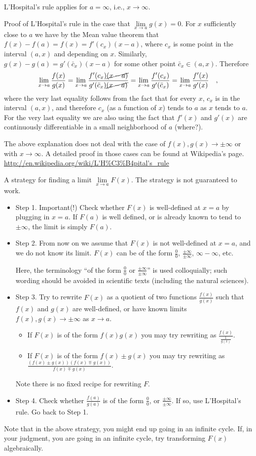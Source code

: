 \documentclass[12pt]{book}
\begin{document}
L'Hospital's rule applies for $a=\infty$, i.e., $x\to \infty$. 

Proof of L'Hospital's rule in the case that $\lim\limits_{x\to a}g(x)=0 $. For $x$ sufficiently close to $a$ we have by the Mean value theorem that $f(x)-f(a)=f(x)=  f'(c_x) (x-a) $, where $c_x$ is some point in the interval $(a,x)$ and depending on $x$. Similarly, $g(x)- g(a)= g'(\bar c_x)(x-a)$ for some other point $\bar c_x\in (a,x)$. Therefore 
\[
\lim\limits_{x\to a}\frac{f(x)}{g(x)}=\lim\limits_{x\to a}\frac{f'(c_x) \cancel{(x-a)}}{ g'(\bar c_x)\cancel{(x-a)}} = \lim\limits_{x\to a}\frac{f'(c_x) }{ g'(\bar c_x)}=\lim\limits_{x\to a}\frac{f'(x) }{ g'(x)}\quad , 
\] 
where the very last equality follows from the fact that for every $x$, $c_x$ is in the interval $(a,x)$, and therefore $c_x$ (as a function of $x$) tends to $a$ as $x$ tends to $a$. For the very last equality we are also using the fact that $f'(x)$ and $g'(x)$ are continuously differentiable in a small neighborhood of $a$ (where?).

The above explanation does not deal with the case of $f(x), g(x)\to\pm \infty $ or with $x\to \infty$. A detailed proof in those cases can be found at Wikipedia's page.
\url{http://en.wikipedia.org/wiki/L'H%C3%B4pital's_rule}

A strategy for finding a limit $\lim\limits_{x\to a}F(x)$. The strategy is not guaranteed to work.
\begin{itemize}
\item Step 1. Important(!) Check whether $F(x)$ is well-defined at $x=a$ by plugging in $x=a$. If $F(a)$ is well defined, or is already known to tend to $\pm \infty$, the limit is simply $F(a)$.
\item Step 2. From now on we assume that $F(x)$ is not well-defined at $x=a$, and we do not know its limit. $F(x)$ can be of the form $\frac{0}{0}$, $\frac{\pm \infty }{\pm \infty}$, $ \infty-\infty$, etc. 

Here, the terminology ``of the form $\frac{0}{0}$ or $\frac{\pm\infty}{\pm \infty}$'' is used colloquially; such wording should be avoided in scientific texts (including the natural sciences).
\item Step 3. Try to rewrite $F(x)$ as a quotient of two functions $\frac{f(x)}{g(x)}$ such that $f(x)$ and $g(x)$ are well-defined, or have known limits $f(x), g(x)\to \pm \infty$ as $x\to a$.
\begin{itemize}
\item If $F(x)$ is of the form $f(x)g(x)$ you may try rewriting as $\frac{f(x)}{\frac{1}{g(x)}}$.
\item If $F(x)$ is of the form $f(x)\pm g(x)$ you may try rewriting as $\frac{(f(x)\pm g(x))(f(x)\mp g(x))}{f(x)\mp g(x)}$.
\end{itemize}
Note there is no fixed recipe for rewriting $F$.
\item Step 4. Check whether $\frac{f(a)}{g(a)}$ is of the form $\frac{0}{0}$, or $\frac{\pm\infty}{\pm \infty}$. If so, use L'Hospital's rule. Go back to Step 1.
\end{itemize}
Note that in the above strategy, you might end up going in an infinite cycle. If, in your judgment, you are going in an infinite cycle, try transforming $F(x)$ algebraically.
\end{document}
